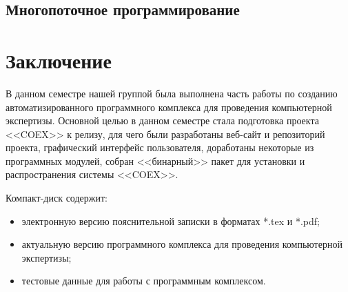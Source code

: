 \newpage
\subsection{ Многопоточное программирование } 



\newpage
\section*{Заключение}
В данном семестре нашей группой была выполнена часть работы по созданию автоматизированного программного комплекса для проведения компьютерной экспертизы. Основной целью в данном семестре стала подготовка проекта <<COEX>> к релизу, для чего были разработаны веб-сайт и репозиторий проекта, графический интерфейс пользователя, доработаны некоторые из программных модулей, собран <<бинарный>> пакет для установки и распространения системы <<COEX>>. 
 
 
 \newpage
 \renewcommand{\refname}{Список использованных источников}
 

 Компакт-диск содержит: 
 \begin{itemize}
 \item электронную версию пояснительной записки в форматах *.tex и *.pdf;
 \item актуальную версию программного комплекса для проведения компьютерной экспертизы;
 \item тестовые данные для работы с программным комплексом.
 \end{itemize}
 
 
 
 
  
 
 

